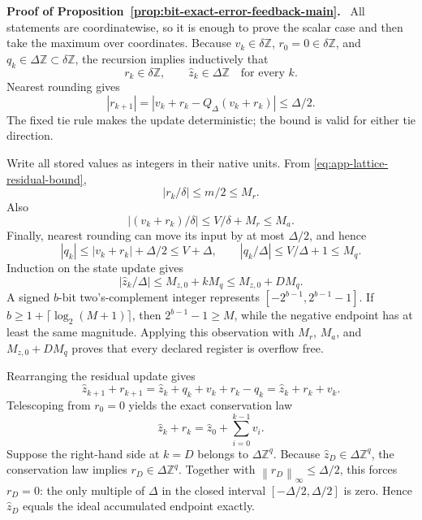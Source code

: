 \documentclass[twoside,11pt]{article}
\renewenvironment{proof}[1][Proof]{\par\noindent\textbf{#1.}\ }{\hfill\BlackBox\par\medskip}
\newcommand{\norm}[1]{\left\lVert #1\right\rVert}
\begin{document}
\begin{proof}[Proof of Proposition~\ref{prop:bit-exact-error-feedback-main}]
All statements are coordinatewise, so it is enough to prove the scalar case
and then take the maximum over coordinates.  Because $v_k\in\delta\mathbb Z$,
$r_0=0\in\delta\mathbb Z$, and $q_k\in\Delta\mathbb Z\subset\delta\mathbb Z$,
the recursion implies inductively that
\begin{equation}
 r_k\in\delta\mathbb Z,
 \qquad \widehat z_k\in\Delta\mathbb Z
 \quad\text{for every }k.
 \label{eq:app-lattice-invariance}
\end{equation}
Nearest rounding gives
\begin{equation}
 |r_{k+1}|=|v_k+r_k-Q_\Delta(v_k+r_k)|\le\Delta/2.
 \label{eq:app-lattice-residual-bound}
\end{equation}
The fixed tie rule makes the update deterministic; the bound is valid for
either tie direction.

Write all stored values as integers in their native units.  From
\eqref{eq:app-lattice-residual-bound},
\begin{equation}
 |r_k/\delta|\le m/2\le M_r.
 \label{eq:app-lattice-r-int}
\end{equation}
Also
\begin{equation}
 |(v_k+r_k)/\delta|
 \le V/\delta+M_r\le M_a.
 \label{eq:app-lattice-a-int}
\end{equation}
Finally, nearest rounding can move its input by at most $\Delta/2$, and hence
\begin{equation}
 |q_k|\le |v_k+r_k|+\Delta/2\le V+\Delta,
 \qquad
 |q_k/\Delta|\le V/\Delta+1\le M_q.
 \label{eq:app-lattice-q-int}
\end{equation}
Induction on the state update gives
\begin{equation}
 |\widehat z_k/\Delta|
 \le M_{z,0}+kM_q
 \le M_{z,0}+DM_q.
 \label{eq:app-lattice-z-int}
\end{equation}
A signed $b$-bit two's-complement integer represents
$[-2^{b-1},2^{b-1}-1]$.  If
$b\ge1+\lceil\log_2(M+1)\rceil$, then
$2^{b-1}-1\ge M$, while the negative endpoint has at least the same
magnitude.  Applying this observation with $M_r$, $M_a$, and
$M_{z,0}+DM_q$ proves that every declared register is overflow free.

Rearranging the residual update gives
\begin{equation}
 \widehat z_{k+1}+r_{k+1}
 =\widehat z_k+q_k+v_k+r_k-q_k
 =\widehat z_k+r_k+v_k.
 \label{eq:app-lattice-one-step-conservation}
\end{equation}
Telescoping from $r_0=0$ yields the exact conservation law
\begin{equation}
 \widehat z_k+r_k
 =\widehat z_0+\sum_{i=0}^{k-1}v_i.
 \label{eq:app-lattice-telescope}
\end{equation}
Suppose the right-hand side at $k=D$ belongs to $\Delta\mathbb Z^q$.
Because $\widehat z_D\in\Delta\mathbb Z^q$, the conservation law implies
$r_D\in\Delta\mathbb Z^q$.  Together with
$\norm{r_D}_\infty\le\Delta/2$, this forces $r_D=0$: the only multiple of
$\Delta$ in the closed interval $[-\Delta/2,\Delta/2]$ is zero.  Hence
$\widehat z_D$ equals the ideal accumulated endpoint exactly.
\end{proof}
\end{document}

